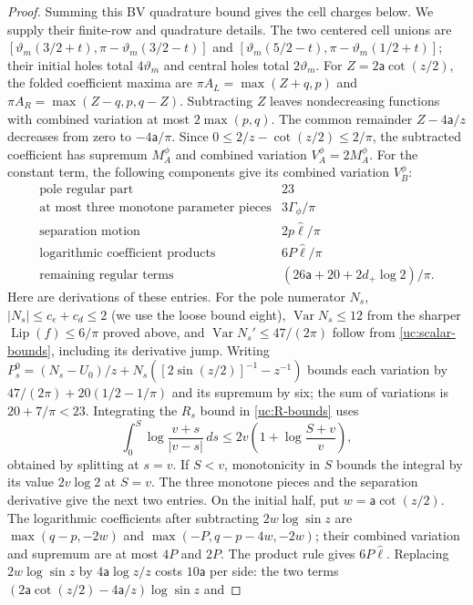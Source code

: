\begin{proof}
Summing this BV quadrature bound gives the cell charges below.
We supply their finite-row and quadrature details. The two centered
cell unions are
$[\vartheta_m(3/2+t),\pi-\vartheta_m(3/2-t)]$ and
$[\vartheta_m(5/2-t),\pi-\vartheta_m(1/2+t)]$; their initial holes total $4\vartheta_m$ and
central holes total $2\vartheta_m$. For $Z=2\mathsf a\cot(z/2)$, the folded coefficient maxima are
$\pi A_L=\max(Z+q,p)$ and $\pi A_R=\max(Z-q,p,q-Z)$.
Subtracting $Z$ leaves nondecreasing functions with combined
variation at most $2\max(p,q)$. The common remainder
$Z-4\mathsf a/z$ decreases from zero to $-4\mathsf a/\pi$.
Since $0\leq2/z-\cot(z/2)\leq2/\pi$, the subtracted coefficient
has supremum $M_A^\phi$ and combined variation $V_A^\phi=2M_A^\phi$.
For the constant term, the following components give its combined
variation $V_B^\phi$:
\[
\begin{array}{cc}
\text{pole regular part}&23\\
\text{at most three monotone parameter pieces}&3\Gamma_\phi/\pi\\
\text{separation motion}&2p\hat{\ell}/\pi\\
\text{logarithmic coefficient products}&6P\hat{\ell}/\pi\\
\text{remaining regular terms}&(26\mathsf{a}+20+2d_+\log2)/\pi.
\end{array}
\]
Here are derivations of these entries. For the pole numerator $N_s$,
$|N_s|\leq c_e+c_d\leq2$ (we use the loose bound eight),
$\operatorname{Var}N_s\leq12$ from the sharper
$\operatorname{Lip}(f)\leq6/\pi$ proved above, and
$\operatorname{Var}N_s'\leq47/(2\pi)$ follow from
\eqref{uc:scalar-bounds}, including its derivative jump. Writing
$P_s^0=(N_s-U_0)/z+N_s([2\sin(z/2)]^{-1}-z^{-1})$ bounds each
variation by $47/(2\pi)+20(1/2-1/\pi)$ and its supremum by six;
the sum of variations is $20+7/\pi<23$.
Integrating the $R_s$ bound in \eqref{uc:R-bounds} uses
\[
 \int_0^S\log\frac{v+s}{|v-s|}\,ds
 \leq2v\left(1+\log\frac{S+v}{v}\right),
\]
obtained by splitting at $s=v$. If $S<v$, monotonicity in $S$
bounds the integral by its value $2v\log2$ at $S=v$. The three monotone pieces and the
separation derivative give the next two entries. On the initial half,
put $w=\mathsf{a}\cot(z/2)$. The logarithmic coefficients after subtracting
$2w\log\sin z$ are $\max(q-p,-2w)$ and
$\max(-P,q-p-4w,-2w)$; their combined variation and supremum are
at most $4P$ and $2P$. The product rule gives $6P\hat{\ell}$.
Replacing $2w\log\sin z$ by $4\mathsf{a}\log z/z$ costs $10\mathsf{a}$ per side:
the two terms
$(2\mathsf{a}\cot(z/2)-4\mathsf{a}/z)\log\sin z$ and

\end{proof}

